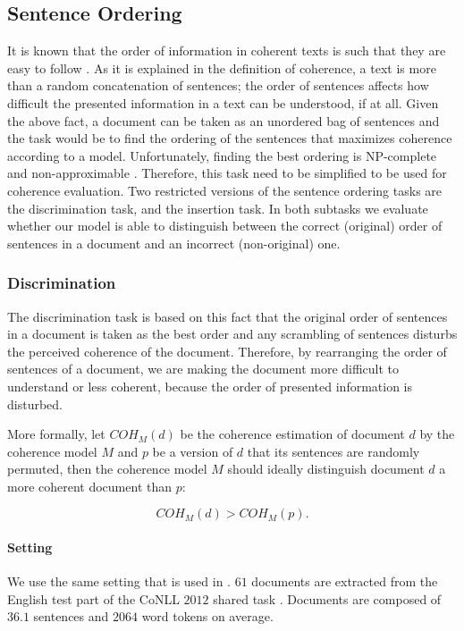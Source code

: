 \subsection{Sentence Ordering}
%
It is known that the order of information in coherent texts is such that they are easy to follow \cite{lapata03,barzilay04,karamanis04b,barzilay05a,soricut06}. 
As it is explained in the definition of coherence, a text is more than a random concatenation of sentences;
the order of sentences affects how difficult the presented information in a text can be understood, if at all. 
Given the above fact, a document can be taken as an unordered bag of sentences and the task would be to find the ordering of the sentences that maximizes coherence according to a model. 
Unfortunately, finding the best ordering is NP-complete \cite{?} and non-approximable \cite{althaus04}.
Therefore, this task need to be simplified to be used for coherence evaluation. 
Two restricted versions of the sentence ordering tasks are the discrimination task, and the insertion task. 
In both subtasks we evaluate whether our model is able to distinguish between the correct (original) order of sentences in a document and an incorrect (non-original) one. 

\subsubsection{Discrimination}
%
The discrimination task is based on this fact that the original order of sentences in a document is taken as the best order and any scrambling of sentences disturbs the perceived coherence of the document. 
Therefore, by rearranging the order of sentences of a document, we are making the document more difficult to understand or less coherent, because the order of presented information is disturbed. 

More formally, let $COH_M(d)$ be the coherence estimation of document $d$ by the coherence model $M$ and $p$ be a version of $d$ that its sentences are randomly permuted, then the coherence model $M$ should ideally distinguish document $d$ a more coherent document than $p$:

\begin{equation}
COH_M(d) > COH_M(p). 
\end{equation}


\paragraph{Setting}
%
We use the same setting that is used in . 
$61$ documents are extracted from the English test part of the CoNLL $2012$ shared task \cite{pradhan12}. 
Documents are composed of $36.1$ sentences and $2064$ word tokens on average. 

